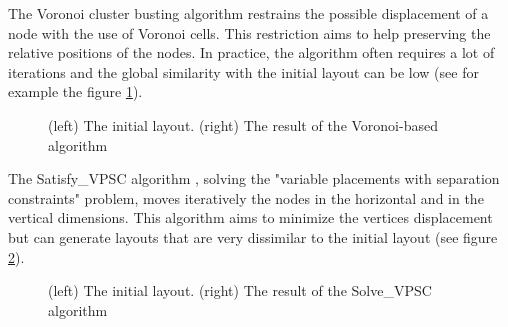 \documentclass[12pt]{report}
\begin{document}
The Voronoi cluster busting algorithm \cite{Gansner98} restrains the possible displacement of a node with the use of Voronoi cells. This restriction aims to help preserving the relative positions of the nodes. In practice, the algorithm often requires a lot of iterations and the global similarity with the initial layout can be low (see for example the figure \ref{voronoi}).

\begin{figure}[h]
  \setlength\fboxsep{5pt}
  \setlength\fboxrule{0.5pt}
  \caption{(left) The initial layout. (right) The result of the Voronoi-based algorithm}
  \label{voronoi}
\end{figure}

The Satisfy\_VPSC algorithm \cite{VPSC06}, solving the "variable placements with separation constraints" problem, moves iteratively the nodes in the horizontal and in the vertical dimensions. This algorithm aims to minimize the vertices displacement but can generate layouts that are very dissimilar to the initial layout (see figure \ref{vpsc}).

\begin{figure}[h]
	\center
  \setlength\fboxsep{5pt}
  \setlength\fboxrule{0.5pt}
  \caption{(left) The initial layout. (right) The result of the Solve\_VPSC algorithm}
  \label{vpsc}
\end{figure}
\end{document}
